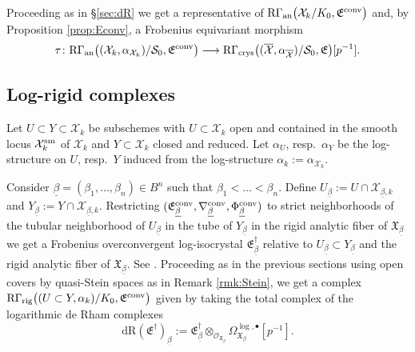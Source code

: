\documentclass[asterisque,english]{smfart}
\begin{document}
Proceeding as in \S \ref{sec:dR} we get a representative of $\mathrm{R}\Gamma_{\mathrm{an}}\bigl(\mathcal{X}_k/K_0,\mathfrak{E}^{\rm conv}\bigr)$ and, by Proposition \ref{prop:Econv},  a Frobenius equivariant morphism $$\tau \colon \mathrm{R}\Gamma_{\mathrm{an}}\bigl((\mathcal{X}_k,\alpha_{\mathcal{X}_k})/\mathcal{S}_0,\mathfrak{E}^{\rm conv}\bigr) \longrightarrow  \mathrm{R}\Gamma_{\mathrm{crys}}\bigl((\overline{\mathcal{X}},\alpha_{\overline{\mathcal{X}}})/\mathcal{S}_0,\mathfrak{E}\bigr) [p^{-1}] .$$







\subsection{Log-rigid complexes}\label{sec:rigsyn}

Let $U\subset Y \subset \mathcal{X}_k$ be subschemes with $U\subset \mathcal{X}_k$ open and contained in the smooth locus $\mathcal{X}_k^{\rm sm}$ of $\mathcal{X}_k$ and $Y\subset \mathcal{X}_k$ closed and reduced. Let $\alpha_{U}$, resp.~$\alpha_Y$ be the log-structure on $U$, resp.~$Y$ induced from the log-structure $\alpha_k:=\alpha_{\mathcal{X}_k}$.  



Consider $\underline{\beta}=(\beta_1,\ldots,\beta_n) \in B^n$ such that $\beta_1<\ldots < \beta_n$. Define $U_{\underline{\beta}}:= U\cap \mathcal{X}_{\underline{\beta},k}$ and $Y_{\underline{\beta}}:= Y\cap \mathcal{X}_{\underline{\beta},k}$. Restricting $(\mathfrak{E}^{\rm conv}_{\underline{\beta}},\nabla_{\underline{\beta}}^{\rm conv}, \Phi_{\underline{\beta}}^{\rm conv})$ to strict neighborhoods  of the tubular neighborhood of $U_{\underline{\beta}}$ in the tube  of $Y_{\underline{\beta}}$ in the rigid analytic fiber of $\mathfrak{X}_{\underline{\beta}}$ we get a Frobenius overconvergent log-isocrystal $\mathfrak{E}_{\underline{\beta}}^\dagger$ relative to $U_{\underline{\beta}}\subset Y_{\underline{\beta}}$ and the  rigid analytic fiber of $\mathfrak{X}_{\underline{\beta}}$.  See \cite[Rmk. 2.2.19]{Shiho}. Proceeding as in the previous sections using open covers by quasi-Stein spaces as in Remark \ref{rmk:Stein}, we get a complex $\mathrm{R}\Gamma_{\mathrm{rig}}\bigl((U\subset Y,\alpha_k)/K_0,\mathfrak{E}^{\rm conv}\bigr)$ given by taking the total complex of the logarithmic de Rham  complexes
$$\mathrm{dR}(\mathfrak{E}^\dagger)_{\underline{\beta}}:=\mathfrak{E}^\dagger_{\underline {\beta}} \otimes_{\mathcal{O}_{\mathfrak{X}_{\underline{\beta}}}}  \Omega_{\mathfrak{X}_{\underline{\beta}}}^{\log,\bullet}[p^{-1}].$$
\end{document}
